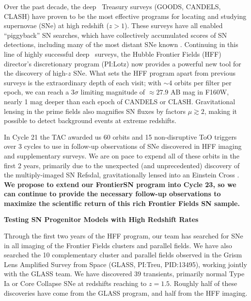 \documentclass[12pt]{article}
\begin{document}
%
%
\justification          %

Over the past decade, the deep \HST\ Treasury surveys (GOODS, CANDELS,
CLASH) have proven to be the most effective programs for locating and
studying supernovae (SNe) at high redshift ($z>1$).  These surveys
have all enabled ``piggyback'' SN searches, which have collectively
accumulated scores of SN detections, including many of the most
distant SNe known
\citep{Riess:2007,Dahlen:2008,Graur:2014,Rodney:2014}.  Continuing in
this line of highly successful deep \HST\ surveys, the Hubble Frontier
Fields (HFF) director's discretionary program (PI:Lotz) now provides a
powerful new tool for the discovery of high-$z$ SNe.  What sets the
HFF program apart from previous surveys is the extraordinary depth of
each visit; with $\sim$4 orbits per filter per epoch, we can reach a
$3\sigma$ limiting magnitude of $\approx27.9$ AB mag in F160W, nearly
1 mag deeper than each epoch of CANDELS or CLASH. Gravitational lensing in
the prime fields also magnifies SN fluxes by factors $\mu\gtrsim2$,
making it possible to detect background events at extreme redshifts.

In Cycle 21 the TAC awarded us 60 orbits and 15 non-disruptive ToO
triggers over 3 cycles to use in follow-up observations of SNe
discovered in HFF imaging and supplementary surveys. We are on pace to
expend all of these orbits in the first 2 years, primarily due to the
unexpected (and unprecedented) discovery of the multiply-imaged SN
Refsdal, gravitationally lensed into an Einstein Cross
\citep{Kelly:2015}.  {\bf We propose to extend our FrontierSN program
  into Cycle 23, so we can continue to provide the necessary follow-up
  observations to maximize the scientific return of this rich Frontier
  Fields SN sample.}

\bigskip
\centerline {\bf Testing SN Progenitor Models with High Redshift Rates} 
\medskip

Through the first two years of the HFF program, our team has searched
for SNe in all imaging of the Frontier Fields clusters and parallel
fields.  We have also searched the 10 complementary cluster and
parallel fields observed in the Grism Lens Amplified Survey from Space
(GLASS, PI:Treu, PID:13495), working jointly with the GLASS team.  We
have discovered 39 transients, primarily normal Type Ia or Core
Collapse SNe at redshifts reaching to $z=1.5$.  Roughly half of these
discoveries have come from the GLASS program, and half from the HFF
imaging.
\end{document}
